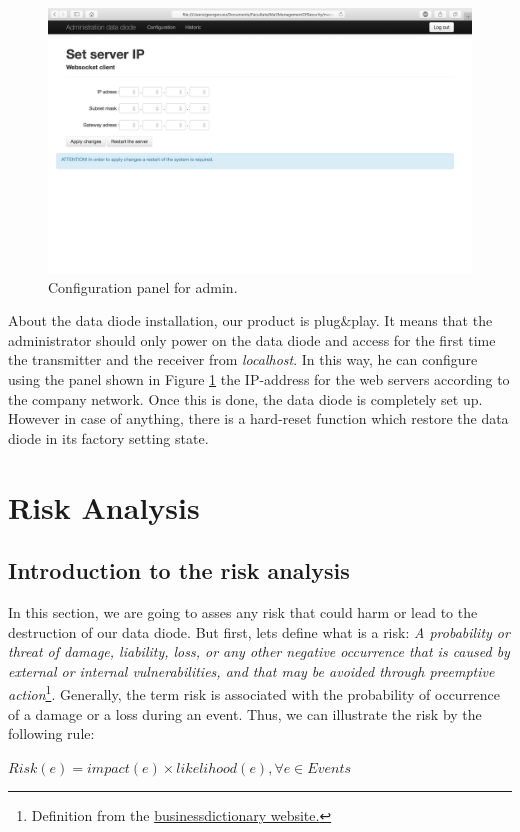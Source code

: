 \documentclass[a4paper,10pt]{article}
\begin{document}
\begin{figure}[!h]
\centering
\includegraphics[scale=0.35]{images/admin-config.png}
\caption{Configuration panel for admin.}
\label{fig:configadminpage}
\end{figure}

About the data diode installation, our product is plug\&play. It means that the administrator should only power on the data diode and access for the first time the transmitter and the receiver from \emph{localhost}. In this way, he can configure using the panel shown in Figure \ref{fig:configadminpage} the IP-address for the web servers according to the company network. Once this is done, the data diode is completely set up. However in case of anything, there is a hard-reset function which restore the data diode in its factory setting state. 
\newpage
\section{Risk Analysis}

\subsection{Introduction to the risk analysis}
In this section, we are going to asses any risk that could harm or lead to the destruction of our data diode. But first, lets define what is a risk: \emph{A probability or threat of damage, liability, loss, or any other negative occurrence that is caused by external or internal vulnerabilities, and that may be avoided through preemptive action}\footnote{Definition from the \href{http://www.businessdictionary.com/definition/risk.html}{businessdictionary website.}}. Generally, the term risk is associated with the probability of occurrence of a damage or a loss during an event. Thus, we can illustrate the risk by the following rule:
\begin{center}
\centering
$Risk(e)= impact(e) \times likelihood(e), \forall e \in Events$
\end{center}
\end{document}
